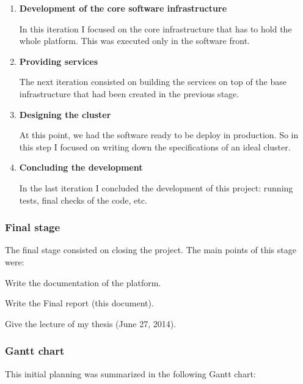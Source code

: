 \begin{enumerate}
\item {\bf Development of the core software infrastructure}

In this iteration I focused on the core infrastructure that has to
hold the whole platform. This was executed only in the software front.

\item {\bf Providing services}

The next iteration consisted on building the services on top of the base
infrastructure that had been created in the previous stage.

\item {\bf Designing the cluster}

At this point, we had the software ready to be deploy in production. So in this
step I focused on writing down the specifications of an ideal cluster.

\item {\bf Concluding the development}

In the last iteration I concluded the development of this project: running
tests, final checks of the code, etc.
\end{enumerate}


\subsubsection*{Final stage}

The final stage consisted on closing the project. The main points of this stage
were:

\mylist
  \item Write the documentation of the platform.
  \item Write the Final report (this document).
  \item Give the lecture of my thesis (June 27, 2014).
\mylistend

\subsubsection*{Gantt chart}

This initial planning was summarized in the following Gantt chart:

